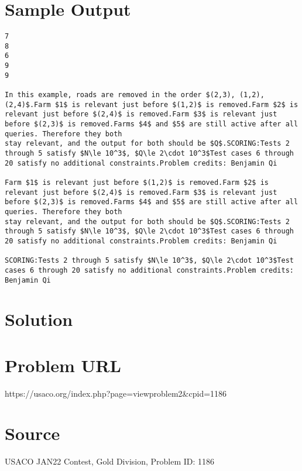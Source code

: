 \documentclass[12pt]{article}
\begin{document}
\section*{Sample Output}
\begin{verbatim}
7
8
6
9
9

In this example, roads are removed in the order $(2,3), (1,2), (2,4)$.Farm $1$ is relevant just before $(1,2)$ is removed.Farm $2$ is relevant just before $(2,4)$ is removed.Farm $3$ is relevant just before $(2,3)$ is removed.Farms $4$ and $5$ are still active after all queries. Therefore they both
stay relevant, and the output for both should be $Q$.SCORING:Tests 2 through 5 satisfy $N\le 10^3$, $Q\le 2\cdot 10^3$Test cases 6 through 20 satisfy no additional constraints.Problem credits: Benjamin Qi

Farm $1$ is relevant just before $(1,2)$ is removed.Farm $2$ is relevant just before $(2,4)$ is removed.Farm $3$ is relevant just before $(2,3)$ is removed.Farms $4$ and $5$ are still active after all queries. Therefore they both
stay relevant, and the output for both should be $Q$.SCORING:Tests 2 through 5 satisfy $N\le 10^3$, $Q\le 2\cdot 10^3$Test cases 6 through 20 satisfy no additional constraints.Problem credits: Benjamin Qi

SCORING:Tests 2 through 5 satisfy $N\le 10^3$, $Q\le 2\cdot 10^3$Test cases 6 through 20 satisfy no additional constraints.Problem credits: Benjamin Qi
\end{verbatim}

\section*{Solution}


\section*{Problem URL}
https://usaco.org/index.php?page=viewproblem2&cpid=1186

\section*{Source}
USACO JAN22 Contest, Gold Division, Problem ID: 1186
\end{document}
